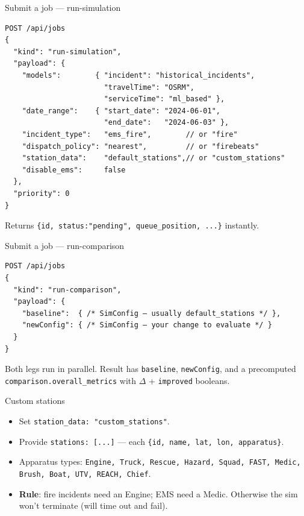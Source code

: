 \documentclass[aspectratio=169,11pt]{beamer}
\begin{document}
\begin{frame}[fragile]{Submit a job — run-simulation}
\begin{lstlisting}[basicstyle=\ttfamily\scriptsize]
POST /api/jobs
{
  "kind": "run-simulation",
  "payload": {
    "models":        { "incident": "historical_incidents",
                       "travelTime": "OSRM",
                       "serviceTime": "ml_based" },
    "date_range":    { "start_date": "2024-06-01",
                       "end_date":   "2024-06-03" },
    "incident_type":   "ems_fire",        // or "fire"
    "dispatch_policy": "nearest",         // or "firebeats"
    "station_data":    "default_stations",// or "custom_stations"
    "disable_ems":     false
  },
  "priority": 0
}
\end{lstlisting}
\vspace{2pt}\small Returns \texttt{\{id, status:"pending", queue\_position, ...\}} instantly.
\end{frame}

\begin{frame}[fragile]{Submit a job — run-comparison}
\begin{lstlisting}[basicstyle=\ttfamily\scriptsize]
POST /api/jobs
{
  "kind": "run-comparison",
  "payload": {
    "baseline":  { /* SimConfig — usually default_stations */ },
    "newConfig": { /* SimConfig — your change to evaluate */ }
  }
}
\end{lstlisting}
\vspace{8pt}
\small Both legs run in parallel. Result has \texttt{baseline}, \texttt{newConfig}, and a precomputed \texttt{comparison.overall\_metrics} with $\Delta$ + \texttt{improved} booleans.
\end{frame}

\begin{frame}{Custom stations}
  \begin{itemize}\setlength\itemsep{6pt}
    \item Set \texttt{station\_data: "custom\_stations"}.
    \item Provide \texttt{stations: [...]} — each \texttt{\{id, name, lat, lon, apparatus\}}.
    \item Apparatus types: \texttt{Engine, Truck, Rescue, Hazard, Squad, FAST, Medic, Brush, Boat, UTV, REACH, Chief}.
    \item \textbf{Rule}: fire incidents need an Engine; EMS need a Medic. Otherwise the sim won't terminate (will time out and fail).
  \end{itemize}
\end{frame}
\end{document}
